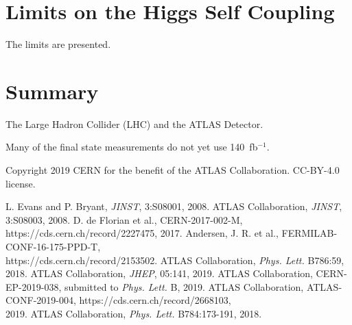 \documentclass{moriond}
\begin{document}
\section{Limits on the Higgs Self Coupling} \label{sec:hh}

The limits are presented.

\section{Summary}

The Large Hadron Collider (LHC) \cite{Evans:2008zzb} and the ATLAS Detector.

Many of the final state measurements do not yet use 140~fb$^{-1}$.

Copyright 2019 CERN for the benefit of the ATLAS Collaboration. CC-BY-4.0 license.

\begin{thebibliography}{99}
 L. Evans and P. Bryant, {\em JINST}, 3:S08001, 2008.
 ATLAS Collaboration, {\em JINST}, 3:S08003, 2008.
 D. de Florian et al., CERN-2017-002-M, https://cds.cern.ch/record/2227475, 2017.
 Andersen, J. R. et al., FERMILAB-CONF-16-175-PPD-T,\\ https://cds.cern.ch/record/2153502.
 ATLAS Collaboration, {\em Phys. Lett.} B786:59, 2018.
 ATLAS Collaboration, {\em JHEP}, 05:141, 2019.
 ATLAS Collaboration, CERN-EP-2019-038, submitted to {\em Phys. Lett.} B, 2019.
 ATLAS Collaboration, ATLAS-CONF-2019-004, https://cds.cern.ch/record/2668103,\\ 2019.
 ATLAS Collaboration, {\em Phys. Lett.} B784:173-191, 2018.
\end{thebibliography}


\end{document}
